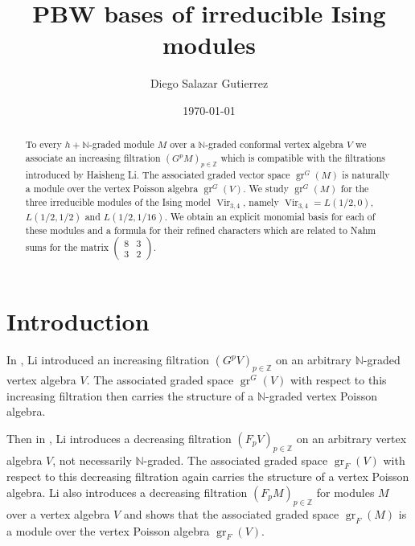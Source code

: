 \documentclass[a4paper, 12pt, reqno]{amsart}
\theoremstyle{remark}
\numberwithin{equation}{subsection}
\DeclareMathOperator{\Vir}{Vir}
\DeclareMathOperator{\gr}{gr}
\begin{document}
\begin{abstract}
  To every $h + \mathbb{N}$-graded module $M$ over a $\mathbb{N}$-graded conformal vertex algebra $V$ we associate an increasing filtration $(G^pM)_{p \in \mathbb{Z}}$ which is compatible with the filtrations introduced by Haisheng Li.
  The associated graded vector space $\gr^G(M)$ is naturally a module over the vertex Poisson algebra $\gr^G(V)$.
  We study $\gr^G(M)$ for the three irreducible modules of the Ising model $\Vir_{3, 4}$, namely $\Vir_{3,4} = L(1/2, 0)$, $L(1/2, 1/2)$ and $L(1/2, 1/16)$.
  We obtain an explicit monomial basis for each of these modules and a formula for their refined characters which are related to Nahm sums for the matrix $\left(\begin{smallmatrix} 8 & 3 \\ 3 & 2 \end{smallmatrix}\right)$.
\end{abstract}

\title{PBW bases of irreducible Ising modules}
\author{Diego Salazar Gutierrez}
\address{Instituto de Matemática Pura e Aplicada, Rio de Janeiro, RJ, Brazil}
\date{\today}
\maketitle

\tableofcontents

\section{Introduction}
\label{sec:introduction}

In \cite{li_vertex_2004}, Li introduced an increasing filtration $(G^pV)_{p \in \mathbb{Z}}$ on an arbitrary $\mathbb{N}$-graded vertex algebra $V$.
The associated graded space $\gr^G(V)$ with respect to this increasing filtration then carries the structure of a $\mathbb{N}$-graded vertex Poisson algebra.

Then in \cite{li_abelianizing_2005}, Li introduces a decreasing filtration $(F_pV)_{p \in \mathbb{Z}}$ on an arbitrary vertex algebra $V$, not necessarily $\mathbb{N}$-graded.
The associated graded space $\gr_F(V)$ with respect to this decreasing filtration again carries the structure of a vertex Poisson algebra.
Li also introduces a decreasing filtration $(F_pM)_{p \in \mathbb{Z}}$ for modules $M$ over a vertex algebra $V$ and shows that the associated graded space $\gr_F(M)$ is a module over the vertex Poisson algebra $\gr_F(V)$.
\end{document}
